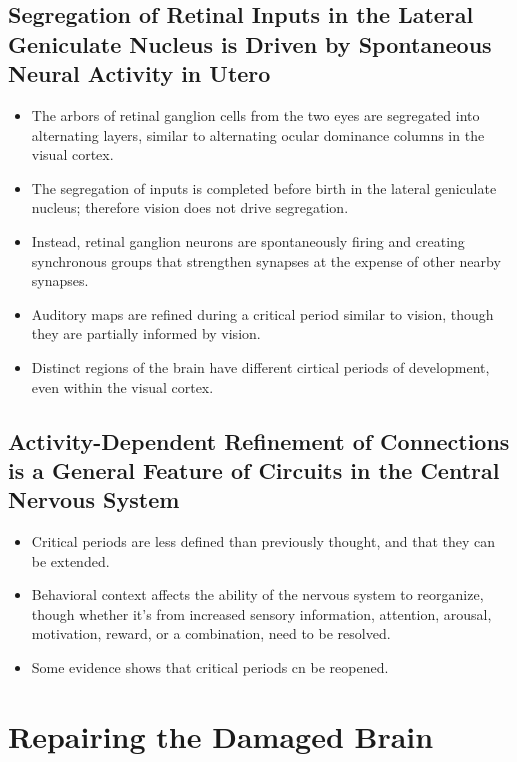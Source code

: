 \documentclass[12pt,a4paper]{article}
\begin{document}
\subsection{Segregation of Retinal Inputs in the Lateral Geniculate Nucleus is Driven by Spontaneous Neural Activity in Utero}
\begin{itemize}
    \item The arbors of retinal ganglion cells from the two eyes are segregated into alternating layers, similar to alternating ocular dominance columns in the visual cortex.
    \item The segregation of inputs is completed before birth in the lateral geniculate nucleus; therefore vision does not drive segregation.
    \item Instead, retinal ganglion neurons are spontaneously firing and creating synchronous groups that strengthen synapses at the expense of other nearby synapses.
    \item Auditory maps are refined during a critical period similar to vision, though they are partially informed by vision.
    \item Distinct regions of the brain have different cirtical periods of development, even within the visual cortex.
\end{itemize}

\subsection{Activity-Dependent Refinement of Connections is a General Feature of Circuits in the Central Nervous System}
\begin{itemize}
    \item Critical periods are less defined than previously thought, and that they can be extended. 
    \item Behavioral context affects the ability of the nervous system to reorganize, though whether it's from increased sensory information, attention, arousal, motivation, reward, or a combination, need to be resolved.
    \item Some evidence shows that critical periods cn be reopened.
\end{itemize}

\clearpage
\section{Repairing the Damaged Brain}
\end{document}
